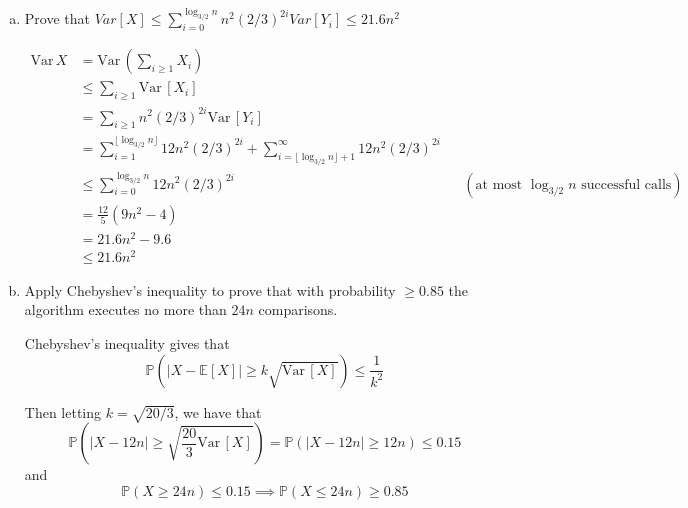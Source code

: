 \documentclass[12pt,letterpaper]{article}
\newcommand{\abs}[1]{\left\vert #1 \right\vert}
\renewcommand{\P}{\mathbb{P}}
\newcommand{\E}{\mathbb{E}}
\newcommand{\Var}{\text{Var}\,}
\begin{document}
\begin{enumerate}[a.]
\item Prove that $Var[X]\leq \sum_{i=0}^{\log_{3/2}n}  n^{2} (2/3)^{2i}  Var[Y_i] \leq 21.6 n^{2} $ 

\color{darkblue}
    \begin{align*}
        \Var X &= \Var\left(\sum_{i \geq 1} X_i\right)\\
        &\leq \sum_{i \geq 1} \Var[X_i]\\
        &= \sum_{i \geq 1} n^2 (2/3)^{2i} \Var[Y_i]\\
        &= \sum_{i = 1}^{\lfloor\log_{3/2} n\rfloor} 12n^2 (2/3)^{2i} + \sum_{i = \lfloor\log_{3/2} n\rfloor + 1}^{\infty} 12n^2 (2/3)^{2i}\\
        &\leq \sum_{i = 0}^{\log_{3/2} n} 12n^2 (2/3)^{2i} && (\text{at most } \log_{3/2} n \text{ successful calls})\\ 
        &= \frac{12}{5} (9n^2 - 4)\\ 
        &= 21.6n^2 - 9.6\\ 
        &\leq 21.6 n^2
    \end{align*}
\color{black}


\item Apply Chebyshev's inequality to prove that with probability $\geq 0.85$ the algorithm executes no more than $24n$ comparisons. 

\color{darkblue}
    Chebyshev's inequality gives that 
    \[\P(|X - \E[X]| \geq k\sqrt{\Var[X]}) \leq \frac{1}{k^2}\]

    Then letting $k = \sqrt{20/3}$, we have that 
    \[\P(|X - 12n| \geq \sqrt{\frac{20}{3} \Var[X]}) =  \P(\abs{X - 12n} \geq 12n) \leq 0.15\]
    and 
    \[\P(X \geq 24n) \leq 0.15 \implies \P(X \leq 24n) \geq 0.85\]
\color{black}

\end{enumerate}
\end{document}
